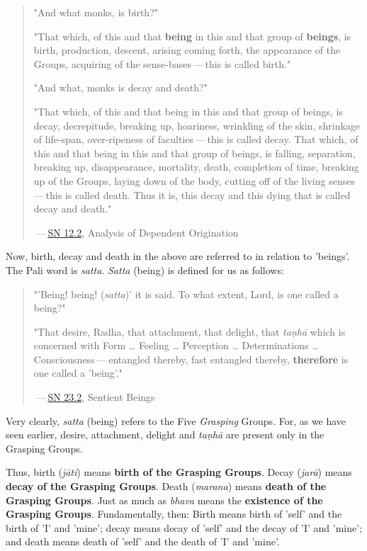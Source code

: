 \begin{quote}
"And what monks, is birth?"

"That which, of this and that \textbf{being} in this and that group of \textbf{beings}, is birth, production, descent, arising coming forth, the appearance of the Groups, acquiring of the sense-bases --- this is called birth."

"And what, monks is decay and death?"

"That which, of this and that being in this and that group of beings, is decay, decrepitude, breaking up, hoariness, wrinkling of the skin, shrinkage of life-span, over-ripeness of faculties --- this is called decay. That which, of this and that being in this and that group of beings, is falling, separation, breaking up, disappearance, mortality, death, completion of time, breaking up of the Groups, laying down of the body, cutting off of the living senses --- this is called death. Thus it is, this decay and this dying that is called decay and death."

 --- \href{https://suttacentral.net/sn12.2/en/bodhi}{SN 12.2}, Analysis of Dependent Origination
\end{quote}

Now, birth, decay and death in the above are referred to in relation to 'beings'. The Pali word is \emph{satta}. \emph{Satta} (being) is defined for us as follows:

\begin{quote}
"'Being! being! (\emph{satta})' it is said. To what extent, Lord, is one called a being?"

"That desire, Radha, that attachment, that delight, that \emph{taṇhā} which is concerned with Form \ldots\hspace{0pt} Feeling \ldots\hspace{0pt} Perception \ldots\hspace{0pt} Determinations \ldots\hspace{0pt} Consciousness --- entangled thereby, fast entangled thereby, \textbf{therefore} is one called a 'being'."

 --- \href{https://suttacentral.net/sn23.2/en/sujato}{SN 23.2}, Sentient Beings
\end{quote}

Very clearly, \emph{satta} (being) refers to the Five \emph{Grasping} Groups. For, as we have seen earlier, desire, attachment, delight and \emph{taṇhā} are present only in the Grasping Groups.

Thus, birth (\emph{jāti}) means \textbf{birth of the Grasping Groups}. Decay (\emph{jarā}) means \textbf{decay of the Grasping Groups}. Death (\emph{marana}) means \textbf{death of the Grasping Groups}. Just as much as \emph{bhava} means the \textbf{existence of the Grasping Groups}. Fundamentally, then: Birth means birth of 'self' and the birth of 'I' and 'mine'; decay means decay of 'self' and the decay of 'I' and 'mine'; and death means death of 'self' and the death of 'I' and 'mine'.

